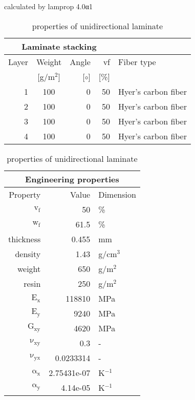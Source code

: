 \begin{table}[!htbp]
  \renewcommand{\arraystretch}{1.2}
  \caption{\label{tab:unidirectional laminate}properties of unidirectional laminate}
  \centering\footnotesize{\rule{0pt}{10pt}
  \tiny calculated by lamprop 4.0α1\\[3pt]}
    \begin{tabular}[t]{rcrrl}
      \multicolumn{4}{c}{\small\textbf{Laminate stacking}}\\[0.1em]
      \toprule %
      Layer & Weight & Angle & vf & Fiber type\\
            & [g/m$^2$] & [$\circ$] & [\%]\\
      \midrule
      1 &  100 &     0 & 50 & Hyer's carbon fiber\\
      2 &  100 &     0 & 50 & Hyer's carbon fiber\\
      3 &  100 &     0 & 50 & Hyer's carbon fiber\\
      4 &  100 &     0 & 50 & Hyer's carbon fiber\\
      \bottomrule
    \end{tabular}\hspace{0.02\textwidth}
    \begin{tabular}[t]{rrl}
      \multicolumn{3}{c}{\small\textbf{Engineering properties}}\\[0.1em]
      \toprule
      Property & Value & Dimension\\
      \midrule
      $\mathrm{v_f}$ & 50 &\%\\
      $\mathrm{w_f}$ & 61.5 &\%\\
      thickness & 0.455 & mm\\
      density & 1.43 & g/cm$^3$\\
      weight & 650 & g/m$^2$\\
      resin & 250 & g/m$^2$\\
      \midrule
      $\mathrm{E_x}$ &   118810 & MPa\\
      $\mathrm{E_y}$ &     9240 & MPa\\
      $\mathrm{G_{xy}}$ &     4620 & MPa\\
      $\mathrm{\nu_{xy}}$ & 0.3 &-\\
      $\mathrm{\nu_{yx}}$ & 0.0233314 &-\\
      $\mathrm{\alpha_x}$ & 2.75431e-07 & K$^{-1}$\\
      $\mathrm{\alpha_y}$ & 4.14e-05 & K$^{-1}$\\
      \bottomrule
    \end{tabular}

\end{table}
